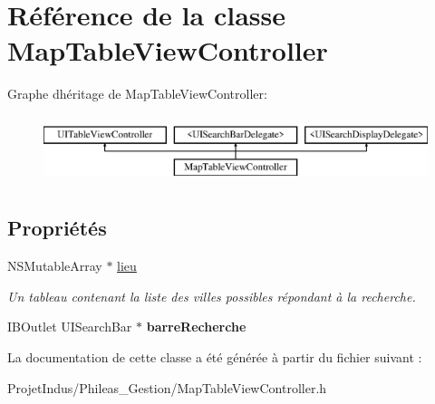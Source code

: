 \hypertarget{interface_map_table_view_controller}{}\section{Référence de la classe Map\+Table\+View\+Controller}
\label{interface_map_table_view_controller}
Graphe d\textquotesingle{}héritage de Map\+Table\+View\+Controller\+:\begin{figure}[H]
\begin{center}
\leavevmode
\includegraphics[height=2.000000cm]{interface_map_table_view_controller}
\end{center}
\end{figure}
\subsection*{Propriétés}
\begin{DoxyCompactItemize}
\item 
\hypertarget{interface_map_table_view_controller_ae9aa38cced8acc150177695315849233}{}N\+S\+Mutable\+Array $\ast$ \hyperlink{interface_map_table_view_controller_ae9aa38cced8acc150177695315849233}{lieu}\label{interface_map_table_view_controller_ae9aa38cced8acc150177695315849233}

\begin{DoxyCompactList}\small\item\em Un tableau contenant la liste des villes possibles répondant à la recherche. \end{DoxyCompactList}\item 
\hypertarget{interface_map_table_view_controller_a9146fdaf9c308e552ef5f32d10cce79b}{}I\+B\+Outlet U\+I\+Search\+Bar $\ast$ {\bfseries barre\+Recherche}\label{interface_map_table_view_controller_a9146fdaf9c308e552ef5f32d10cce79b}

\end{DoxyCompactItemize}


La documentation de cette classe a été générée à partir du fichier suivant \+:\begin{DoxyCompactItemize}
\item 
Projet\+Indus/\+Phileas\+\_\+\+Gestion/Map\+Table\+View\+Controller.\+h\end{DoxyCompactItemize}

